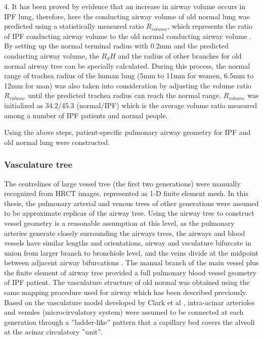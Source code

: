 4. It has been proved by evidence that an increase in airway volume occurs in IPF lung, therefore, here the conducting airway volume of old normal lung was predicted using a statistically measured ratio $R_{volume}$, which represents the ratio of IPF conducting airway volume to the old normal conducting airway volume \citep{plantier2016increased}. By setting up the normal terminal radius with 0.2mm and the predicted conducting airway volume, the $R_dH$ and the radius of other branches for old normal airway tree can be specially calculated. During this process, the normal range of trachea radius of the human lung (5mm to 11mm for women, 6.5mm to 12mm for man) was also taken into consideration \citep{breatnach1984dimensions} by adjusting the volume ratio $R_{volume}$ until the predicted trachea radius can reach the normal range. $R_{volume}$ was initialized as 34.2/45.3 (normal/IPF) which is the average volume ratio measured among a number of IPF patients and normal people. 

Using the above steps, patient-specific pulmonary airway geometry for IPF and old normal lung were constructed. 

\subsubsection{Vasculature tree}
The centrelines of large vessel tree (the first two generations) were manually recognized from HRCT images, represented as 1-D finite element mesh. In this thesis, the pulmonary arterial and venous trees of other generations were assumed to be approximate replicas of the airway tree. Using the airway tree to construct vessel geometry is a reasonable assumption at this level, as the pulmonary arteries generate closely surrounding the airways trees, the airways and blood vessels have similar lengths and orientations, airway and vsculature bifurcate in union from larger branch to bronchiole level, and the veins divide at the midpoint between adjacent airway bifurcations \citep{weibel1984pathway, hsia2016lung}. The manual branch of the main vessel plus the finite element of airway tree provided a full pulmonary blood vessel geometry of IPF patient. The vasculature structure of old normal was obtained using the same mapping procedure used for airway which has been described previously. Based on the vasculature model developed by Clark et al \citep{clark2010contribution,clark2011interdependent}, intra-acinar arterioles and venules (microcirvulatory system) were assumed to be connected at each generation through a ''ladder-like'' pattern that a capillary bed covers the alveoli at the acinar circulatory ''unit''.

